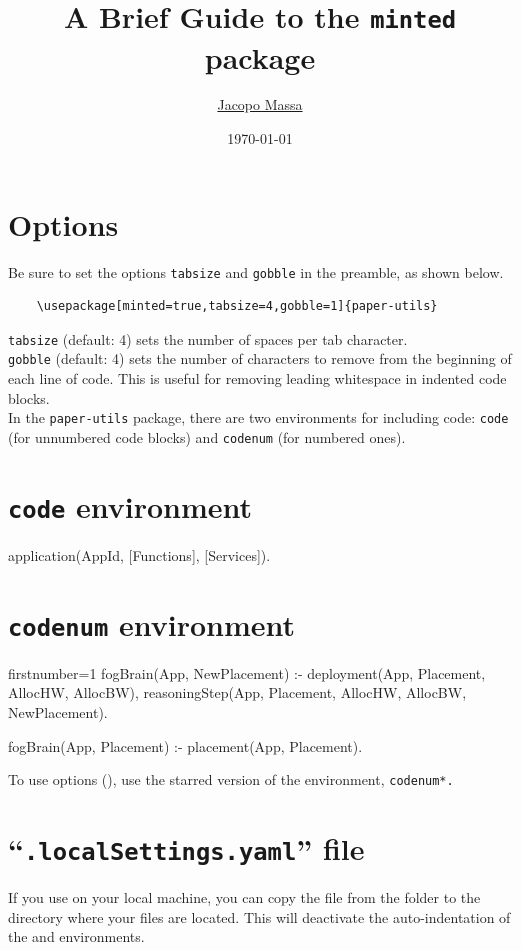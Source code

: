 \documentclass{article}
\title{A Brief Guide to the \texttt{minted} package}
\date{\today}
\author{\href{https://pages.di.unipi.it/massa}{Jacopo Massa}}
\begin{document}
\maketitle

\section*{Options}
Be sure to set the options \verb|tabsize| and \verb|gobble| in the preamble, as shown below.

\begin{Verbatim}
	\usepackage[minted=true,tabsize=4,gobble=1]{paper-utils}
\end{Verbatim}

\noindent
\verb|tabsize| (default: 4) sets the number of spaces per tab character.\\
\verb|gobble| (default: 4) sets the number of characters to remove from the beginning of each line of code. This is useful for removing leading whitespace in indented code blocks.\\

\noindent In the \texttt{paper-utils} package, there are two environments for including code: \verb|code| (for unnumbered code blocks) and \verb|codenum| (for numbered ones).

\section*{\texttt{code} environment}
\begin{code}
    application(AppId, [Functions], [Services]).
\end{code}

\section*{\texttt{codenum} environment}
\begin{codenum*}{firstnumber=1}
    fogBrain(App, NewPlacement) :-
        deployment(App, Placement, AllocHW, AllocBW),
        reasoningStep(App, Placement, AllocHW, AllocBW, NewPlacement).

    fogBrain(App, Placement) :-
    placement(App, Placement).
\end{codenum*}

\noindent To use options (\eg {}), use the starred version of the environment, \ie \verb|codenum*.|

\section*{``\texttt{.localSettings.yaml}'' file}

If you use  on your local machine, you can copy the  file from the  folder to the directory where your  files are located. This will deactivate the auto-indentation of the  and  environments.
\end{document}
